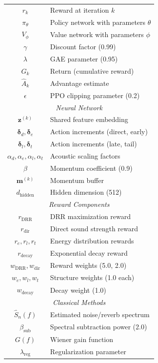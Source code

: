 \documentclass[12pt,a4paper]{article}
\begin{document}
\begin{table}[h]
\begin{tabular}{cl}
$r_k$ & Reward at iteration $k$ \\
$\pi_\theta$ & Policy network with parameters $\theta$ \\
$V_\phi$ & Value network with parameters $\phi$ \\
$\gamma$ & Discount factor (0.99) \\
$\lambda$ & GAE parameter (0.95) \\
$G_k$ & Return (cumulative reward) \\
$\hat{A}_k$ & Advantage estimate \\
$\epsilon$ & PPO clipping parameter (0.2) \\
\midrule
\multicolumn{2}{c}{\textit{Neural Network}} \\
\midrule
$\mathbf{z}^{(k)}$ & Shared feature embedding \\
$\boldsymbol{\delta}_d, \boldsymbol{\delta}_e$ & Action increments (direct, early) \\
$\boldsymbol{\delta}_l, \boldsymbol{\delta}_t$ & Action increments (late, tail) \\
$\alpha_d, \alpha_e, \alpha_l, \alpha_t$ & Acoustic scaling factors \\
$\beta$ & Momentum coefficient (0.9) \\
$\mathbf{m}^{(k)}$ & Momentum buffer \\
$d_{\text{hidden}}$ & Hidden dimension (512) \\
\midrule
\multicolumn{2}{c}{\textit{Reward Components}} \\
\midrule
$r_{\text{DRR}}$ & DRR maximization reward \\
$r_{\text{dir}}$ & Direct sound strength reward \\
$r_e, r_l, r_t$ & Energy distribution rewards \\
$r_{\text{decay}}$ & Exponential decay reward \\
$w_{\text{DRR}}, w_{\text{dir}}$ & Reward weights (5.0, 2.0) \\
$w_e, w_l, w_t$ & Structure weights (1.0 each) \\
$w_{\text{decay}}$ & Decay weight (1.0) \\
\midrule
\multicolumn{2}{c}{\textit{Classical Methods}} \\
\midrule
$\hat{S}_n(f)$ & Estimated noise/reverb spectrum \\
$\beta_{\text{sub}}$ & Spectral subtraction power (2.0) \\
$G(f)$ & Wiener gain function \\
$\lambda_{\text{reg}}$ & Regularization parameter \\

\end{tabular}
\end{table}
\end{document}
